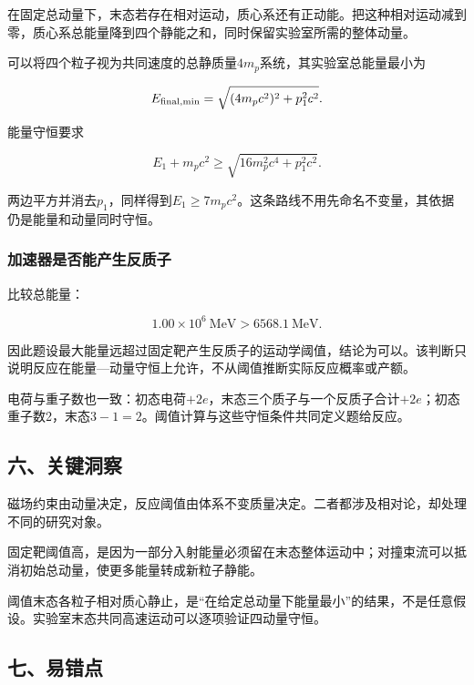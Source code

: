 \documentclass[12pt,a4paper,fontset=fandol]{ctexart}
\begin{document}
在固定总动量下，末态若存在相对运动，质心系还有正动能。把这种相对运动减到零，质心系总能量降到四个静能之和，同时保留实验室所需的整体动量。

可以将四个粒子视为共同速度的总静质量\(4m_p\)系统，其实验室总能量最小为

\[
E_{\rm final,min}
=\sqrt{(4m_pc^2)^2+p_1^2c^2}.
\]

能量守恒要求

\[
E_1+m_pc^2
\geq\sqrt{16m_p^2c^4+p_1^2c^2}.
\]

两边平方并消去\(p_1\)，同样得到\(E_1\geq7m_pc^2\)。这条路线不用先命名不变量，其依据仍是能量和动量同时守恒。

\par\noindent\begin{minipage}{\linewidth}
\subsubsection{加速器是否能产生反质子}\label{ux52a0ux901fux5668ux662fux5426ux80fdux4ea7ux751fux53cdux8d28ux5b50}

比较总能量：

\[
1.00\times10^6\ \mathrm{MeV}
>6568.1\ \mathrm{MeV}.
\]

因此题设最大能量远超过固定靶产生反质子的运动学阈值，结论为可以。该判断只说明反应在能量---动量守恒上允许，不从阈值推断实际反应概率或产额。

电荷与重子数也一致：初态电荷\(+2e\)，末态三个质子与一个反质子合计\(+2e\)；初态重子数2，末态\(3-1=2\)。阈值计算与这些守恒条件共同定义题给反应。

\end{minipage}\par
\subsection{六、关键洞察}\label{ux516dux5173ux952eux6d1eux5bdf-3}

磁场约束由动量决定，反应阈值由体系不变质量决定。二者都涉及相对论，却处理不同的研究对象。

固定靶阈值高，是因为一部分入射能量必须留在末态整体运动中；对撞束流可以抵消初始总动量，使更多能量转成新粒子静能。

阈值末态各粒子相对质心静止，是``在给定总动量下能量最小''的结果，不是任意假设。实验室末态共同高速运动可以逐项验证四动量守恒。

\subsection{七、易错点}\label{ux4e03ux6613ux9519ux70b9-3}
\end{document}
